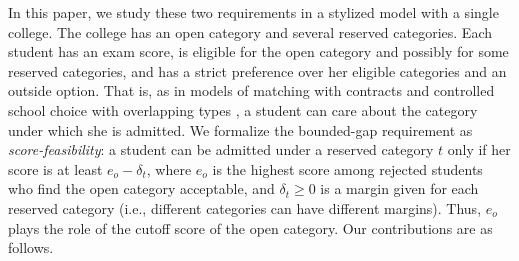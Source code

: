 \documentclass[a4paper,twoside]{article}
\theoremstyle{definition}
\begin{document}
In this paper, we study these two requirements in a stylized model with a single
college. The college has an open category and several reserved categories.
Each student has an exam score, is eligible for the open category and possibly for some
reserved categories, and has a strict preference over her eligible categories and an
outside option.
That is, as in models of matching with contracts \cite{HaMi05a,AyTu20a} and controlled
school choice with overlapping types \cite{KHIY17a}, a student can care about the
category under which she is admitted.
We formalize the bounded-gap requirement as \emph{score-feasibility}: a student can be
admitted under a reserved category $t$ only if her score is at least $e_o-\delta_t$, where
$e_o$ is the highest score among rejected students who find the open category
acceptable, and $\delta_t\ge 0$ is a margin given for each reserved category
(i.e., different categories can have different margins). 
Thus, $e_o$ plays the role of the cutoff score of the open category.
Our contributions are as follows.

\end{document}
